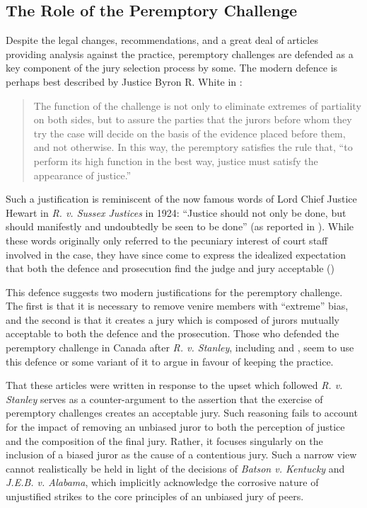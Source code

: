 \subsection{The Role of the Peremptory Challenge} \label{sec:roleper}

Despite the legal changes, recommendations, and a great deal of articles providing analysis against the practice, peremptory challenges are
defended as a key component of the jury selection process by some. The modern defence is perhaps best described by Justice Byron
R. White in \cite{swainvalabama}:

\begin{quote}
The function of the challenge is not only to eliminate extremes of partiality on both sides, but to assure the parties that the
jurors before whom they try the case will decide on the basis of the evidence placed before them, and not otherwise. In this way,
the peremptory satisfies the rule that, ``to perform its high function in the best way, justice must satisfy the appearance of
justice.''
\end{quote}

Such a justification is reminiscent of the now famous words of Lord Chief Justice Hewart in \textit{R. v. Sussex Justices} in 1924:
``Justice should not only be done, but should manifestly and undoubtedly be seen to be done'' (as reported in
\cite{oakes2016}). While these words originally only referred to the pecuniary interest of court staff involved in the case, they
have since come to express the idealized expectation that both the defence and prosecution find the judge and jury acceptable (\cite{oakes2016})

This defence suggests two modern justifications for the peremptory challenge. The first is that it is necessary to remove venire members with
``extreme'' bias, and the second is that it creates a jury which is composed of jurors mutually acceptable to both the defence and
the prosecution. Those who defended the peremptory
challenge in Canada after \textit{R. v. Stanley}, including
\cite{peremparegood} and \cite{macnabproper}, seem to use this defence or some variant of it to argue in favour of keeping the
practice.

That these articles were written in response to the upset which followed \textit{R. v. Stanley} serves as a counter-argument to
the assertion that the exercise of peremptory challenges creates an acceptable jury. Such reasoning fails to account for the
impact of removing an unbiased juror to both the perception of justice and the composition of the final jury. Rather, it focuses
singularly on the inclusion of a biased juror as the cause of a contentious jury. Such a narrow view cannot
realistically be held in light of the decisions of \textit{Batson v. Kentucky} and \textit{J.E.B. v. Alabama}, which implicitly
acknowledge the corrosive nature of unjustified strikes to the core principles of an unbiased jury of peers.


